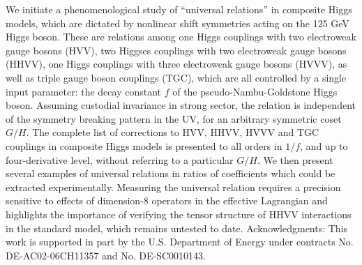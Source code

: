 We initiate a phenomenological study of ``universal relations'' in composite Higgs models, which  are  dictated by nonlinear shift symmetries acting on the 125 GeV Higgs boson. These are relations among one Higgs couplings with two electroweak gauge bosons (HVV), two Higgses couplings with two electroweak gauge bosons (HHVV), one Higgs couplings with three electroweak gauge bosons (HVVV), as well as triple gauge boson couplings (TGC), which are all controlled by a single input parameter: the decay constant $f$ of the pseudo-Nambu-Goldstone Higgs boson.  Assuming custodial invariance in strong sector, the  relation is independent of the symmetry breaking pattern in the UV, for an arbitrary  symmetric coset $G/H$. The complete list of corrections to HVV, HHVV, HVVV and TGC couplings in composite Higgs models is presented to all orders in $1/f$, and up to four-derivative level,  without referring to a particular $G/H$. We then present several examples of  universal relations in ratios of coefficients which could be extracted experimentally. Measuring the universal relation requires a precision sensitive to effects of dimension-8 operators in the effective Lagrangian and highlights the importance of verifying the tensor structure of HHVV interactions in the standard model, which remains untested to date.
Acknowledgments: 
This work is supported in part by the U.S. Department of Energy under contracts No. DE-AC02-06CH11357 and No. DE-SC0010143.

